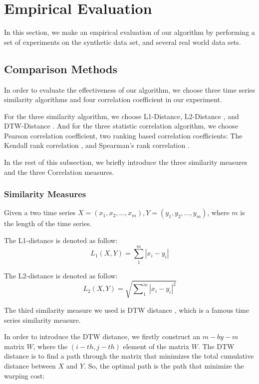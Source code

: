 \section{Empirical Evaluation}
In this section, we make an empirical evaluation of our algorithm by performing a set of experiments on the synthetic data set, and several real world data sets.

\subsection{Comparison Methods}
In order to evaluate the effectiveness of our algorithm, we choose three time series similarity algorithms and four correlation coefficient in our experiment. 

For the three similarity algorithm, we choose L1-Distance, L2-Distance \cite{han2011data}, and DTW-Distance \cite{muller2007dynamic}. 
And for the three statistic correlation algorithm, we choose Pearson correlation coefficient\cite{nagelkerke1991note}, two ranking based correlation coefficients: The Kendall rank correlation \cite{kendall1938new}, and Spearman's rank correlation \cite{pirie1988spearman}.

In the rest of this subsection, we briefly introduce the three similarity measures and the three Correlation measures.

\subsubsection{Similarity Measures}

Given a two time series 
$X=(x_1,x_2,...,x_m),Y=(y_1,y_2,...,y_m)$, where $m$ is the length of the time series.

The L1-distance is denoted as follow:
\begin{equation}
L_1(X,Y) = \sum_{1}^{m}|x_i-y_i|
\end{equation}

The L2-distance is denoted as follow:
\begin{equation}
L_2(X,Y) = \sqrt{\sum\nolimits_{1}^{m}|x_i-y_i|^2}
\end{equation}

The third similarity measure we used is DTW distance \cite{muller2007dynamic}, which is a famous time series similarity measure.

In order to introduce the DTW distance, we firstly construct an $m-by-m$ matrix $W$, where the $(i-{th},j-{th})$ element of the matrix $W$. The DTW distance is to find a path through the matrix that minimizes the total cumulative distance between $X$ and $Y$. 
So, the optimal path is the path that minimize the warping cost:

